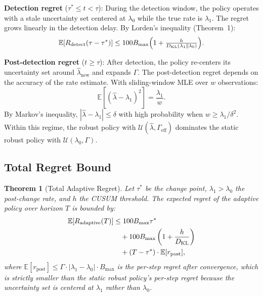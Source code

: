 \documentclass[11pt,twocolumn]{article}
\theoremstyle{plain}
\newtheorem{theorem}{Theorem}[section]
\theoremstyle{definition}
\begin{document}
\textbf{Detection regret} ($\tau^* \le t < \tau$): During the detection window, the policy operates with a stale uncertainty set centered at $\lambda_0$ while the true rate is $\lambda_1$. The regret grows linearly in the detection delay. By Lorden's inequality (Theorem~1):
\begin{equation}
\mathbb{E}[R_{\text{detect}}(\tau - \tau^*)] \le 100 B_{\max}
\Bigl(1 + \tfrac{h}{D_{\text{KL}}(\lambda_1 \parallel \lambda_0)}\Bigr).
\label{eq:detect-bound}
\end{equation}

\textbf{Post-detection regret} ($t \ge \tau$): After detection, the policy re-centers its uncertainty set around $\hat{\lambda}_{\text{new}}$ and expands $\Gamma$. The post-detection regret depends on the accuracy of the rate estimate. With sliding-window MLE over $w$ observations:
\begin{equation}
\mathbb{E}[(\hat{\lambda} - \lambda_1)^2] = \frac{\lambda_1}{w}.
\label{eq:mse}
\end{equation}
By Markov's inequality, $|\hat{\lambda} - \lambda_1| \le \delta$ with high probability when $w \ge \lambda_1 / \delta^2$. Within this regime, the robust policy with $\mathcal{U}(\hat{\lambda}, \Gamma_{\text{eff}})$ dominates the static robust policy with $\mathcal{U}(\lambda_0, \Gamma)$.

\subsection{Total Regret Bound}

\begin{theorem}[Total Adaptive Regret]
Let $\tau^*$ be the change point, $\lambda_1 > \lambda_0$ the post-change rate, and $h$ the CUSUM threshold. The expected regret of the adaptive policy over horizon $T$ is bounded by:
\begin{align}
\mathbb{E}[R_{\text{adaptive}}(T)] &\le 100 B_{\max} \tau^* \notag \\
&\quad + 100 B_{\max} \left(1 + \frac{h}{D_{\text{KL}}}\right) \notag \\
&\quad + (T - \tau^*) \cdot \mathbb{E}[r_{\text{post}}],
\label{eq:total-bound}
\end{align}
where $\mathbb{E}[r_{\text{post}}] \le \Gamma \cdot |\lambda_1 - \lambda_0| \cdot B_{\max}$ is the per-step regret after convergence, which is strictly smaller than the static robust policy's per-step regret because the uncertainty set is centered at $\lambda_1$ rather than $\lambda_0$.
\end{theorem}
\end{document}
